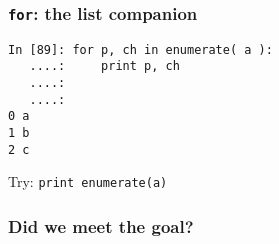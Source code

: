\documentclass[14pt,compress]{beamer}
\newcounter{time}
\newcommand{\inctime}[1]{\addtocounter{time}{#1}{\tiny \thetime\ m}}
\newcommand{\typ}[1]{\texttt{#1}}
\begin{document}
\begin{frame}[fragile]
  \frametitle{\typ{for}: the list companion}
  \begin{lstlisting}
In [89]: for p, ch in enumerate( a ):
   ....:     print p, ch
   ....:     
   ....:     
0 a
1 b
2 c
  \end{lstlisting}
Try: \typ{print enumerate(a)}
\inctime{10}
\end{frame}


\begin{frame}
  \frametitle{Did we meet the goal?}
  \tableofcontents
\end{frame}
\end{document}
